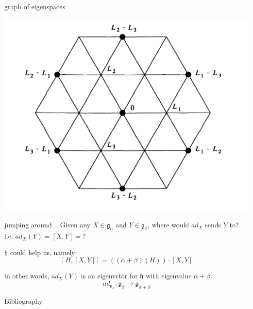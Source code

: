 \documentclass{beamer}
\begin{document}
\begin{frame}{graph of eigenspaces}
\begin{center} \includegraphics[scale=.3]{eigenvalue.jpg}\end{center}	
\end{frame}


\begin{frame}{jumping around ..}
Given any $X \in  \mathfrak{g}_{\alpha}$ and $Y \in \mathfrak{g}_{\beta}$, where would $ad_{X}$ sends $Y$ to? i.e.  $ad_{X}(Y) = [X,Y] = ?$

$\mathfrak{h}$ could help us, namely:
		\[[H,[X,Y]] = ((\alpha+\beta)(H)) \cdot [X,Y] \]

in other words, $ad_{X}(Y)$ is an eigenvctor for $\mathfrak{h}$ with eigenvalue  $\alpha +\beta$.  \[
			ad_{\mathfrak{g}_{\alpha}}: \mathfrak{g}_{\beta} \to \mathfrak{g}_{\alpha+\beta}
		\] 
\end{frame}


\begin{frame}{Bibliography}


\end{frame}
\end{document}
